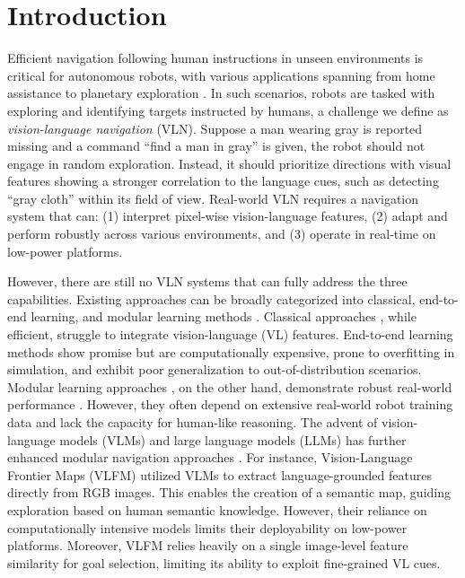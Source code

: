 \vspace{-5pt}
\section{Introduction}
\label{sec:intro}

\vspace{-5pt}
Efficient navigation following human instructions in unseen environments is critical for autonomous robots, with various applications spanning from home assistance \cite{szot2021habitat,warrier2022autonomous,xu2024naturalvlm} to planetary exploration \cite{se2004vision,yashchenko2024intelligent,surwase2024application}. In such scenarios, robots are tasked with exploring and identifying targets instructed by humans, a challenge we define as \textit{vision-language navigation} (VLN). Suppose a man wearing gray is reported missing and a command ``find a man in gray'' is given, the robot should not engage in random exploration. Instead, it should prioritize directions with visual features showing a stronger correlation to the language cues, such as detecting ``gray cloth'' within its field of view. 
Real-world VLN requires a navigation system that can: (1) interpret pixel-wise vision-language features, (2) adapt and perform robustly across various environments, and (3) operate in real-time on low-power platforms.  



However, there are still no VLN systems that can fully address the three capabilities.
Existing approaches can be broadly categorized into classical, end-to-end learning, and modular learning methods \cite{gervet2023navigating}. 
Classical approaches \cite{elfes1989using,fennema1990experiments,thrun1999minerva,yamauchi1997frontier}, while efficient, struggle to integrate vision-language (VL) features.
End-to-end learning methods \cite{mirowski2016learning,savva2017minos,codevilla2018end,singh2023scene,ramrakhya2022habitat} 
show promise but are computationally expensive, prone to overfitting in simulation, and exhibit poor generalization to out-of-distribution scenarios.
Modular learning approaches \cite{chaplot2020object,ramakrishnan2022poni,hahn2021no,chaplot2021seal,chaplot2020neural}, on the other hand, demonstrate robust real-world performance \cite{gervet2023navigating}. However, they often depend on extensive real-world robot training data and lack the capacity for human-like reasoning.
The advent of vision-language models (VLMs) and large language models (LLMs) has further enhanced modular navigation approaches \cite{gadre2023cows, yin2025sg, liu2024dynamem, yokoyama2024vlfm}. For instance, Vision-Language Frontier Maps (VLFM) \cite{yokoyama2024vlfm} utilized VLMs to extract language-grounded features directly from RGB images. This enables the creation of a semantic map, guiding exploration based on human semantic knowledge.
However, their reliance on computationally intensive models limits their deployability on low-power platforms. Moreover, VLFM relies heavily on a single image-level feature similarity for goal selection, limiting its ability to exploit fine-grained VL cues.

